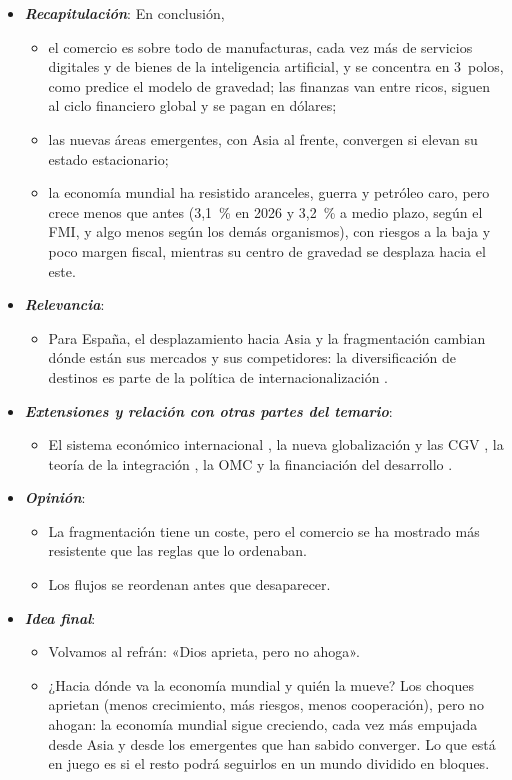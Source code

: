 \documentclass[11pt]{article}
\begin{document}
\begin{itemize}
\item \textbf{\emph{Recapitulación}}: En conclusión,
  \begin{itemize}
  \item el comercio es sobre todo de manufacturas, cada vez más de servicios digitales y de bienes de la inteligencia artificial, y se concentra en 3~polos, como predice el modelo de gravedad; las finanzas van entre ricos, siguen al ciclo financiero global y se pagan en dólares;
  \item las nuevas áreas emergentes, con Asia al frente, convergen si elevan su estado estacionario;
  \item la economía mundial ha resistido aranceles, guerra y petróleo caro, pero crece menos que antes (3,1~\% en 2026 y 3,2~\% a medio plazo, según el FMI, y algo menos según los demás organismos), con riesgos a la baja y poco margen fiscal, mientras su centro de gravedad se desplaza hacia el este\nocite{FMI2026WEO}.
  \end{itemize}
\item \textbf{\emph{Relevancia}}:
  \begin{itemize}
  \item Para España, el desplazamiento hacia Asia y la fragmentación cambian dónde están sus mercados y sus competidores: la diversificación de destinos es parte de la política de internacionalización  .
  \end{itemize}
\item \textbf{\emph{Extensiones y relación con otras partes del temario}}:
  \begin{itemize}
  \item El sistema económico internacional  , la nueva globalización y las CGV , la teoría de la integración , la OMC  y la financiación del desarrollo .
  \end{itemize}
\item \textbf{\emph{Opinión}}:
  \begin{itemize}
  \item La fragmentación tiene un coste, pero el comercio se ha mostrado más resistente que las reglas que lo ordenaban.
  \item Los flujos se reordenan antes que desaparecer.
  \end{itemize}
\item \textbf{\emph{Idea final}}:
  \begin{itemize}
  \item Volvamos al refrán: «Dios aprieta, pero no ahoga».
  \item ¿Hacia dónde va la economía mundial y quién la mueve? Los choques aprietan (menos crecimiento, más riesgos, menos cooperación), pero no ahogan: la economía mundial sigue creciendo, cada vez más empujada desde Asia y desde los emergentes que han sabido converger. Lo que está en juego es si el resto podrá seguirlos en un mundo dividido en bloques.
  \end{itemize}
\end{itemize}
\end{document}
